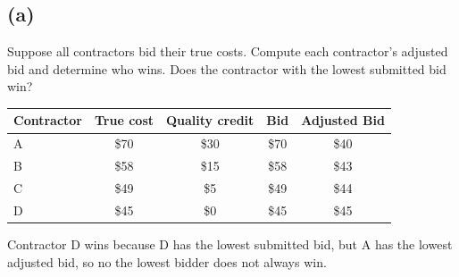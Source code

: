 \documentclass[newpages, arabicsubsec]{assignment}
\begin{document}
\subsection*{(a)}
\begin{problem}
Suppose all contractors bid their true costs. Compute each contractor's adjusted bid and determine who wins. Does the contractor with the lowest submitted bid win?
\end{problem}

\begin{solution}
    \begin{table}[h!]
        \centering
        \begin{tabular}{lcccc}
            \hline
            Contractor & True cost & Quality credit & Bid  & Adjusted Bid \\
            \hline
            A          & \$70      & \$30           & \$70 & \$40         \\
            B          & \$58      & \$15           & \$58 & \$43         \\
            C          & \$49      & \$5            & \$49 & \$44         \\
            D          & \$45      & \$0            & \$45 & \$45         \\
            \hline
        \end{tabular}
    \end{table}
    Contractor D wins because D has the lowest submitted bid, but A has the lowest adjusted bid, so no the lowest bidder does not always win.
\end{solution}
\end{document}
